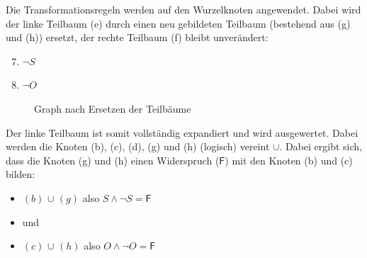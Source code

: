 Die Transformationsregeln werden auf den Wurzelknoten angewendet. Dabei wird der linke Teilbaum (e) durch einen neu gebildeten Teilbaum (bestehend aus (g) und (h)) ersetzt, der rechte Teilbaum (f) bleibt unverändert:
\begin{enumerate}[label= (\alph*)]
    \setcounter{enumi}{6}
    \item $\neg S$
    \item $\neg O$
\end{enumerate}

\begin{figure}[htbp]
    \centering
    \caption{Graph nach Ersetzen der Teilbäume}
\end{figure}

Der linke Teilbaum ist somit vollständig expandiert und wird ausgewertet. Dabei werden die Knoten (b), (c), (d), (g) und (h) (logisch) vereint \textcircled{$\cup$}. Dabei ergibt sich,  dass die Knoten (g) und (h) einen Widerspruch ($\mathsf{F}$) mit den Knoten (b) und (c) bilden:
\begin{itemize}
    \item $(b)$ \textcircled{$\cup$} $(g)$ also $S \wedge \neg S = \mathsf{F}$
    \item[] und
    \item $(c)$ \textcircled{$\cup$} $(h)$ also $O \wedge \neg O = \mathsf{F}$
\end{itemize}

